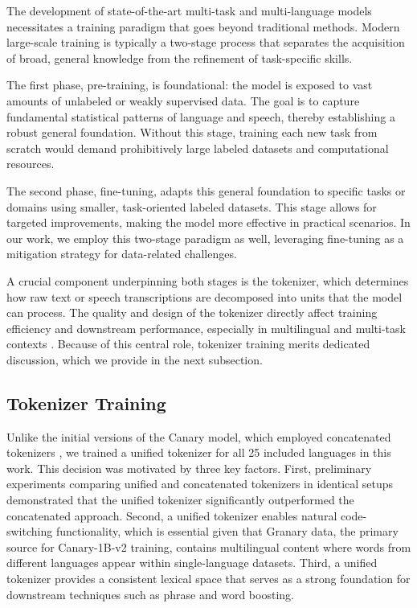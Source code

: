 \label{sec:training}

The development of state-of-the-art multi-task and multi-language models necessitates a training paradigm that goes beyond traditional methods. Modern large-scale training is typically a two-stage process that separates the acquisition of broad, general knowledge from the refinement of task-specific skills.

The first phase, pre-training, is foundational: the model is exposed to vast amounts of unlabeled or weakly supervised data. The goal is to capture fundamental statistical patterns of language and speech, thereby establishing a robust general foundation. Without this stage, training each new task from scratch would demand prohibitively large labeled datasets and computational resources.

The second phase, fine-tuning, adapts this general foundation to specific tasks or domains using smaller, task-oriented labeled datasets. This stage allows for targeted improvements, making the model more effective in practical scenarios. In our work, we employ this two-stage paradigm as well, leveraging fine-tuning as a mitigation strategy for data-related challenges.

A crucial component underpinning both stages is the tokenizer, which determines how raw text or speech transcriptions are decomposed into units that the model can process. The quality and design of the tokenizer directly affect training efficiency and downstream performance, especially in multilingual and multi-task contexts \cite{abagyan2025tokenizerruleallemergent}. Because of this central role, tokenizer training merits dedicated discussion, which we provide in the next subsection.

\subsection{Tokenizer Training}

Unlike the initial versions of the Canary model, which employed concatenated tokenizers \cite{concatenated_tokenizer}, we trained a unified tokenizer for all 25 included languages in this work. This decision was motivated by three key factors. First, preliminary experiments comparing unified and concatenated tokenizers in identical setups demonstrated that the unified tokenizer significantly outperformed the concatenated approach. Second, a unified tokenizer enables natural code-switching functionality, which is essential given that Granary data, the primary source for Canary-1B-v2 training, contains multilingual content where words from different languages appear within single-language datasets. Third, a unified tokenizer provides a consistent lexical space that serves as a strong foundation for downstream techniques such as phrase and word boosting.

